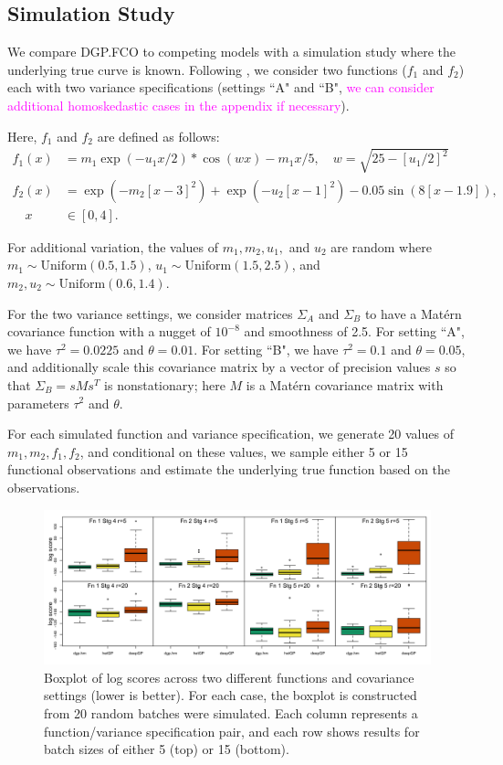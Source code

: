 \documentclass[11pt]{article}
\begin{document}
\subsection{Simulation Study}
\label{subsec:sim}

We compare DGP.FCO to competing models with a simulation study where the underlying 
true curve is known. Following \cite{moran2024dpc}, we consider two functions 
($f_1$ and $f_2$) each with two variance specifications (settings ``A" and ``B", 
\textcolor{magenta}{we can consider additional homoskedastic cases in the appendix if necessary}). 

Here, $f_1$ and $f_2$ are defined as follows:
\begin{align}
  f_1(x) &= m_1 \exp(-u_1x/2) * \cos(wx) - m_1x/5, \quad w=\sqrt{25-[u_1/2]^2} \\
  f_2(x) &= \exp(-m_2[x-3]^2)+\exp(-u_2[x-1]^2)-0.05\sin(8[x-1.9]), \\ 
  \quad x &\in [0,4].
\end{align}

For additional variation, the values of $m_1, m_2, u_1,$ and $u_2$ are random where 
$m_1 \sim \text{Uniform}(0.5,1.5)$, $u_1 \sim \text{Uniform}(1.5,2.5)$, and $m_2,u_2 
\sim \text{Uniform}(0.6,1.4)$. 
      
For the two variance settings, we consider matrices $\Sigma_A$ and $\Sigma_B$ to 
have a Mat\'ern covariance function with a nugget of $10^{-8}$ and smoothness of 2.5. 
For setting ``A", we have $\tau^2=0.0225$ and $\theta=0.01$. For setting ``B", we have 
$\tau^2=0.1$ and $\theta=0.05$, and additionally scale this covariance matrix by 
a vector of precision values $s$ so that $\Sigma_B = s M s^T$ is nonstationary; here $M$ is 
a Mat\'ern covariance matrix with parameters $\tau^2$ and $\theta$.

For each simulated function and variance specification, we generate 20 values of 
$m_1, m_2, f_1, f_2$, and conditional on these values, we sample either 5 or 15 
functional observations and estimate the underlying true function based on the observations.

\begin{figure}[t]
    \centering
    \includegraphics[width=6in]{sims_logS.png}
    \caption{Boxplot of log scores across two different functions and covariance 
             settings (lower is better). For each case, the boxplot is constructed 
             from 20 random batches were simulated. Each column represents a function/variance 
             specification pair, and each row shows results for batch sizes of either 
             5 (top) or 15 (bottom).}
    \label{fig:sims_logS}
\end{figure}
\end{document}

